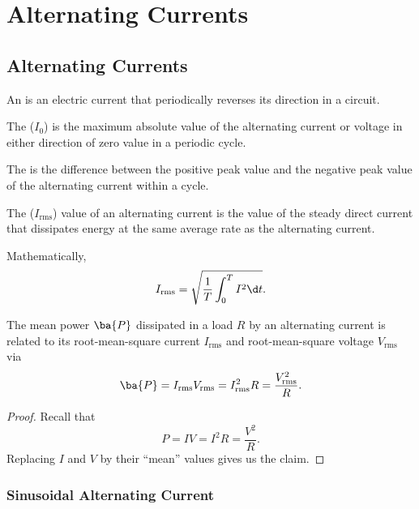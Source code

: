 \chapter{Alternating Currents}

\section{Alternating Currents}

\begin{definition}
    An  is an electric current that periodically reverses its direction in a circuit.
\end{definition}

\begin{definition}
    The  ($I_0$) is the maximum absolute value of the alternating current or voltage in either direction of zero value in a periodic cycle.
\end{definition}

\begin{definition}
    The  is the difference between the positive peak value and the negative peak value of the alternating current within a cycle.
\end{definition}

\begin{definition}
    The  ($I_{\text{rms}}$) value of an alternating current is the value of the steady direct current that dissipates energy at the same average rate as the alternating current.
\end{definition}

Mathematically, \[I_{\text{rms}} = \sqrt{\frac1T \int_0^T I^2 \d t}.\]

\begin{proposition}
    The mean power $\ba{P}$ dissipated in a load $R$ by an alternating current is related to its root-mean-square current $I_{\text{rms}}$ and root-mean-square voltage $V_{\text{rms}}$ via \[\ba{P} = I_{\text{rms}} V_{\text{rms}} = I_{\text{rms}}^2 R = \frac{V_{\text{rms}}^2}{R}.\]
\end{proposition}
\begin{proof}
    Recall that \[P = IV = I^2 R = \frac{V^2}{R}.\] Replacing $I$ and $V$ by their ``mean'' values gives us the claim.
\end{proof}

\subsection{Sinusoidal Alternating Current}

